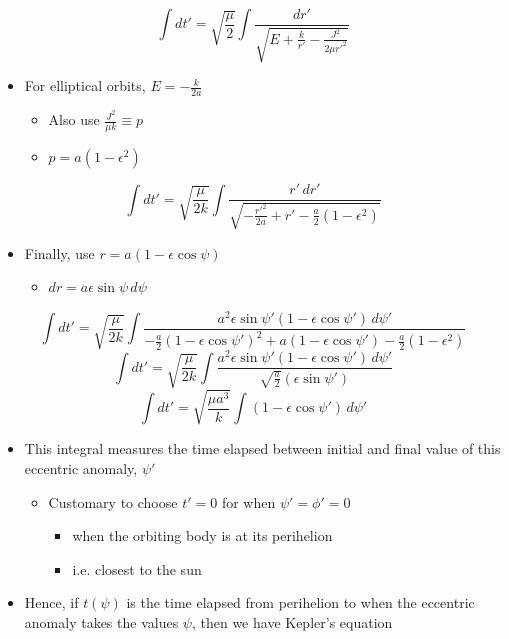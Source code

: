 \documentclass[a4paper,11pt,normalem]{article}
\begin{document}
\[
    \int dt' = \sqrt{\frac{\mu}{2}} \int \frac{dr'}{\sqrt{E + \tfrac{k}{r'} - \tfrac{J^2}{2\mu r'^2}}}
\]

\begin{itemize}
\item
  For elliptical orbits, \(E = -\frac{k}{2a}\)
  \begin{itemize}
  \item
    Also use \(\frac{J^2}{\mu k} \equiv p\)
  \item
    \(p = a(1 - \epsilon^2)\)
  \end{itemize}
\end{itemize}

\[
    \int dt' = \sqrt{\frac{\mu}{2k}} \int \frac{r'\,dr'}{\sqrt{-\tfrac{r'^2}{2a} + r' - \tfrac{a}{2}(1 - \epsilon^2)}}
\]

\begin{itemize}
\item
  Finally, use \(r = a(1 - \epsilon\cos\psi)\)
  \begin{itemize}
  \item
    \(dr = a\epsilon\sin\psi\,d\psi\)
  \end{itemize}
\end{itemize}

\[
    \int dt' = \sqrt{\frac{\mu}{2k}} \int \frac{a^2\epsilon\sin\psi'(1 - \epsilon\cos\psi')\,d\psi'}{-\tfrac{a}{2}(1 - \epsilon\cos\psi')^2 + a(1 - \epsilon\cos\psi') - \tfrac{a}{2}(1 - \epsilon^2)} \]
\[
    \int dt' = \sqrt{\frac{\mu}{2k}} \int \frac{a^2\epsilon\sin\psi' (1 - \epsilon\cos\psi')\,d\psi'}{\sqrt{\tfrac{a}{2}}(\epsilon\sin\psi')} \]
\[
    \int dt' = \sqrt{\frac{\mu a^3}{k}} \int (1 - \epsilon\cos\psi')\,d\psi'
\]

\begin{itemize}
\item
  This integral measures the time elapsed between initial and final
  value of this eccentric anomaly, \(\psi'\)
  \begin{itemize}
  \item
    Customary to choose \(t' = 0\) for when \(\psi' = \phi' = 0\)
    \begin{itemize}
    \item
      when the orbiting body is at its perihelion
    \item
      i.e. closest to the sun
    \end{itemize}
  \end{itemize}
\item
  Hence, if \(t(\psi)\) is the time elapsed from perihelion to when the
  eccentric anomaly takes the values \(\psi\), then we have Kepler's
  equation
\end{itemize}
\end{document}
